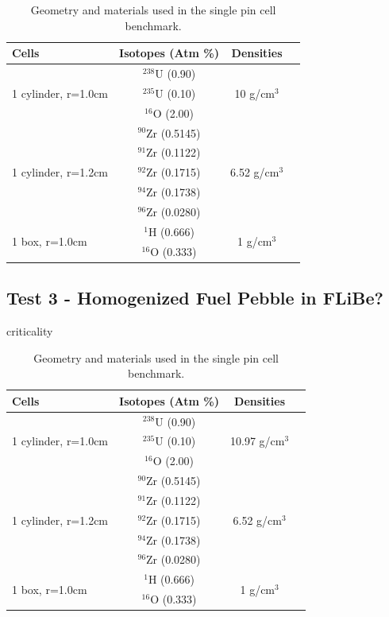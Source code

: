 \documentclass[preprint,12pt]{elsarticle}
\begin{document}
\begin{table}[h]
\centering
\caption{Geometry and materials used in the single pin cell benchmark.}
\label{jezebel_geom}
\begin{tabular}{| l | c | c | c |}
\hline
Cells & Isotopes (Atm \%)& Densities \\
\hline
\multirow{3}{*}{1 cylinder, r=1.0cm }  &   $^{238}$U   (0.90) &    \multirow{3}{*}{10 g/cm$^3$} \\
&  $^{235}$U (0.10)& \\
&  $^{16}$O  (2.00)& \\
\hline
\multirow{5}{*}{1 cylinder, r=1.2cm }  &   $^{90}$Zr   (0.5145) &    \multirow{5}{*}{6.52 g/cm$^3$} \\
&  $^{91}$Zr  (0.1122)& \\
&  $^{92}$Zr  (0.1715)& \\
&  $^{94}$Zr  (0.1738)& \\
&  $^{96}$Zr  (0.0280)& \\
\hline
\multirow{2}{*}{1 box, r=1.0cm }  &   $^{1}$H   (0.666) &    \multirow{2}{*}{1 g/cm$^3$} \\
&  $^{16}$O  (0.333)& \\
\hline
\end{tabular}
\end{table}


\subsection{Test 3 - Homogenized Fuel Pebble in FLiBe?}

criticality

\begin{table}[h]
\centering
\caption{Geometry and materials used in the single pin cell benchmark.}
\label{jezebel_geom}
\begin{tabular}{| l | c | c | c |}
\hline
Cells & Isotopes (Atm \%)& Densities \\
\hline
\multirow{3}{*}{1 cylinder, r=1.0cm }  &   $^{238}$U   (0.90) &    \multirow{3}{*}{10.97 g/cm$^3$} \\
&  $^{235}$U (0.10)& \\
&  $^{16}$O  (2.00)& \\
\hline
\multirow{5}{*}{1 cylinder, r=1.2cm }  &   $^{90}$Zr   (0.5145) &    \multirow{5}{*}{6.52 g/cm$^3$} \\
&  $^{91}$Zr  (0.1122)& \\
&  $^{92}$Zr  (0.1715)& \\
&  $^{94}$Zr  (0.1738)& \\
&  $^{96}$Zr  (0.0280)& \\
\hline
\multirow{2}{*}{1 box, r=1.0cm }  &   $^{1}$H   (0.666) &    \multirow{2}{*}{1 g/cm$^3$} \\
&  $^{16}$O  (0.333)& \\
\hline
\end{tabular}
\end{table}
\end{document}
